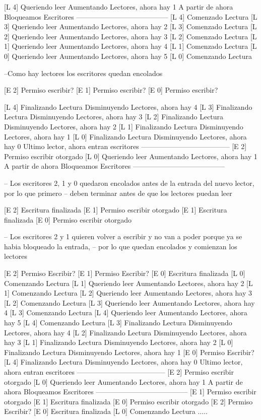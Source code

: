 \begin{scriptsize}
\begin{verbatimtab}

[L 4] Queriendo leer
Aumentando Lectores, ahora hay 1
A partir de ahora Bloqueamos Escritores
---------------------------------------
[L 4] Comenzado Lectura
[L 3] Queriendo leer
Aumentando Lectores, ahora hay 2
[L 3] Comenzado Lectura
[L 2] Queriendo leer
Aumentando Lectores, ahora hay 3
[L 2] Comenzado Lectura
[L 1] Queriendo leer
Aumentando Lectores, ahora hay 4
[L 1] Comenzado Lectura
[L 0] Queriendo leer
Aumentando Lectores, ahora hay 5
[L 0] Comenzando Lectura

--Como hay lectores los escritores quedan encolados

[E 2] Permiso escribir?
[E 1] Permiso escribir?
[E 0] Permiso escribir?

[L 4] Finalizando Lectura
Disminuyendo Lectores, ahora hay 4
[L 3] Finalizando Lectura
Disminuyendo Lectores, ahora hay 3
[L 2] Finalizando Lectura
Disminuyendo Lectores, ahora hay 2
[L 1] Finalizando Lectura
Disminuyendo Lectores, ahora hay 1
[L 0] Finalizando Lectura
Disminuyendo Lectores, ahora hay 0
Ultimo lector, ahora entran escritores
--------------------------------------
[E 2] Permiso escribir otorgado
[L 0] Queriendo leer
Aumentando Lectores, ahora hay 1
A partir de ahora Bloqueamos Escritores
---------------------------------------

-- Los escritores 2, 1 y 0 quedaron encolados antes de la entrada del nuevo lector, por lo que primero
-- deben terminar antes de que los lectores puedan leer

[E 2] Escritura finalizada
[E 1] Permiso escribir otorgado
[E 1] Escritura finalizada
[E 0] Permiso escribir otorgado

-- Los escritores 2 y 1 quieren volver a escribir y no van a poder porque ya se habia bloqueado la entrada,
-- por lo que quedan encolados y comienzan los lectores

[E 2] Permiso Escribir?
[E 1] Permiso Escribir?
[E 0] Escritura finalizada
[L 0] Comenzando Lectura
[L 1] Queriendo leer
Aumentando Lectores, ahora hay 2
[L 1] Comenzando Lectura
[L 2] Queriendo leer
Aumentando Lectores, ahora hay 3
[L 2] Comenzando Lectura
[L 3] Queriendo leer
Aumentando Lectores, ahora hay 4
[L 3] Comenzando Lectura
[L 4] Queriendo leer
Aumentando Lectores, ahora hay 5
[L 4] Comenzando Lectura
[L 3] Finalizando Lectura
Disminuyendo Lectores, ahora hay 4
[L 2] Finalizando Lectura
Disminuyendo Lectores, ahora hay 3
[L 1] Finalizando Lectura
Disminuyendo Lectores, ahora hay 2
[L 0] Finalizando Lectura
Disminuyendo Lectores, ahora hay 1
[E 0] Permiso Escribir?
[L 4] Finalizando Lectura
Disminuyendo Lectores, ahora hay 0
Ultimo lector, ahora entran escritores
--------------------------------------
[E 2] Permiso escribir otorgado 
[L 0] Queriendo leer
Aumentando Lectores, ahora hay 1
A partir de ahora Bloqueamos Escritores
---------------------------------------
[E 1] Permiso escribir otorgado
[E 1] Escritura finalizada
[E 0] Permiso escribir otorgado
[E 2] Permiso Escribir?
[E 0] Escritura finalizada
[L 0] Comenzando Lectura
.....

\end{verbatimtab}
\end{scriptsize}
